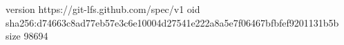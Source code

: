 version https://git-lfs.github.com/spec/v1
oid sha256:d74663c8ad77eb57e3c6e10004d27541e222a8a5e7f06467bfbfef9201131b5b
size 98694
